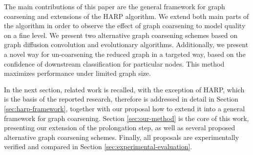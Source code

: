 
The main contributions of this paper are the general framework for graph coarsening and extensions of the HARP algorithm. We extend both main parts of the algorithm in order to observe the effect of graph coarsening to model quality on a fine level. We present two alternative graph coarsening schemes based on graph diffusion convolution and evolutionary algorithms. Additionally, we present a novel way for un-coarsening the reduced graph in a targeted way, based on the confidence of downstream classification for particular nodes. This method maximizes performance under limited graph size.

In the next section, related work is recalled, with the exception of HARP, which is the basis of the reported research, therefore is addressed in detail in Section \ref{sec:harp-framework}, together with our proposal how to extend it into a general framework for graph coarsening. Section \ref{sec:our-method} is the core of this work, presenting our extension of the prolongation step, as well as several proposed alternative graph coarsening schemes. Finally, all proposals are experimentally verified and compared in Section \ref{sec:experimental-evaluation}.
